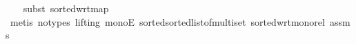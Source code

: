 \begin{isabellebody}
\ \ \isamarkupfalse%
\ {\isacharparenleft}{\kern0pt}subst\ sorted{\isacharunderscore}{\kern0pt}wrt{\isacharunderscore}{\kern0pt}map{\isacharparenright}{\kern0pt}\isanewline
\ \ \isamarkupfalse%
\ {\isacharparenleft}{\kern0pt}metis\ {\isacharparenleft}{\kern0pt}no{\isacharunderscore}{\kern0pt}types{\isacharcomma}{\kern0pt}\ lifting{\isacharparenright}{\kern0pt}\ monoE\ sorted{\isacharunderscore}{\kern0pt}sorted{\isacharunderscore}{\kern0pt}list{\isacharunderscore}{\kern0pt}of{\isacharunderscore}{\kern0pt}multiset\ sorted{\isacharunderscore}{\kern0pt}wrt{\isacharunderscore}{\kern0pt}mono{\isacharunderscore}{\kern0pt}rel\ assms{\isacharparenright}{\kern0pt}%
\endisatagproof
{\isafoldproof}%
%
\isadelimproof
\isanewline
%
\endisadelimproof
%
\isadelimtheory
\isanewline
%
\endisadelimtheory
%
\isatagtheory
{}\isamarkupfalse%
%
\endisatagtheory
{\isafoldtheory}%
%
\isadelimtheory
%
\endisadelimtheory
%
\end{isabellebody}%
\endinput
